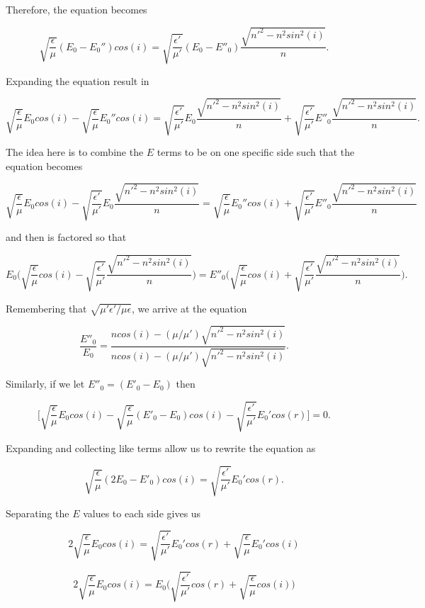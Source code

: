 \documentclass[11pt]{article}
\begin{document}
Therefore, the equation becomes

$$
\sqrt{\frac{\epsilon}{\mu}}(E_{0} - E_{0}'')cos(i) = \sqrt{\frac{\epsilon'}{\mu'}}(E_{0} - E''_{0})\frac{\sqrt{n'^{2} - n^{2}sin^{2}(i)}}{n}.
$$

Expanding the equation result in 

$$
\sqrt{\frac{\epsilon}{\mu}}E_{0}cos(i) - \sqrt{\frac{\epsilon}{\mu}}E_{0}''cos(i) = \sqrt{\frac{\epsilon'}{\mu'}}E_{0}\frac{\sqrt{n'^{2} - n^{2}sin^{2}(i)}}{n} + \sqrt{\frac{\epsilon'}{\mu'}}E''_{0}\frac{\sqrt{n'^{2} - n^{2}sin^{2}(i)}}{n}.
$$

The idea here is to combine the $E$ terms to be on one specific side such that the equation becomes

$$
\sqrt{\frac{\epsilon}{\mu}}E_{0}cos(i) - \sqrt{\frac{\epsilon'}{\mu'}}E_{0}\frac{\sqrt{n'^{2} - n^{2}sin^{2}(i)}}{n} = \sqrt{\frac{\epsilon}{\mu}}E_{0}''cos(i) + \sqrt{\frac{\epsilon'}{\mu'}}E''_{0}\frac{\sqrt{n'^{2} - n^{2}sin^{2}(i)}}{n}
$$

and then is factored so that 

$$
E_{0}\Bigg(\sqrt{\frac{\epsilon}{\mu}}cos(i) - \sqrt{\frac{\epsilon'}{\mu'}}\frac{\sqrt{n'^{2} - n^{2}sin^{2}(i)}}{n}\Bigg)= E''_{0}\Bigg(\sqrt{\frac{\epsilon}{\mu}}cos(i) + \sqrt{\frac{\epsilon'}{\mu'}}\frac{\sqrt{n'^{2} - n^{2}sin^{2}(i)}}{n}\Bigg).
$$

Remembering that $\sqrt{\mu'\epsilon'/ \mu\epsilon}$, we arrive at the equation

$$
\frac{E''_{0}}{E_{0}} = \frac{ncos(i) - (\mu/\mu')\sqrt{n'^{2} - n^{2}sin^{2}(i)}}{ncos(i) - (\mu/\mu')\sqrt{n'^{2} - n^{2}sin^{2}(i)}}.
$$

Similarly, if we let $E''_{0} = (E'_{0} - E_{0})$ then 

$$
\Bigg[\sqrt{\frac{\epsilon}{\mu}}E_{0}cos(i) - \sqrt{\frac{\epsilon}{\mu}}(E'_{0} - E_{0})cos(i) - 
\sqrt{\frac{\epsilon'}{\mu'}}E_{0}'cos(r)\Bigg] = 0.
$$

Expanding and collecting like terms allow us to rewrite the equation as

$$
\sqrt{\frac{\epsilon}{\mu}}(2E_{0} - E'_{0})cos(i) =
\sqrt{\frac{\epsilon'}{\mu'}}E_{0}'cos(r).
$$

Separating the $E$ values to each side gives us

$$
2\sqrt{\frac{\epsilon}{\mu}}E_{0}cos(i) = \sqrt{\frac{\epsilon'}{\mu'}}E_{0}'cos(r) + \sqrt{\frac{\epsilon}{\mu}}E_{0}'cos(i)
$$

$$
2\sqrt{\frac{\epsilon}{\mu}}E_{0}cos(i) = E_{0}\Bigg(\sqrt{\frac{\epsilon'}{\mu'}}cos(r) + \sqrt{\frac{\epsilon}{\mu}}cos(i)\Bigg)
$$
\end{document}
